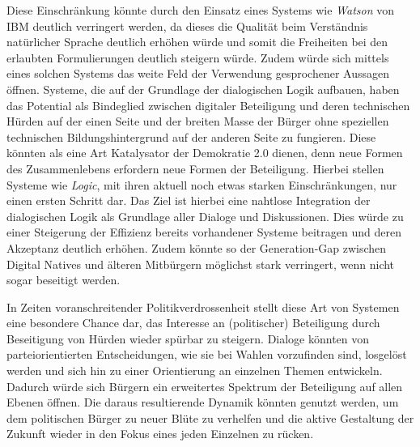 \documentclass[11pt,a4paper,bibtotocnumbered]{scrreprt}
\begin{document}
Diese Einschränkung könnte durch den Einsatz eines Systems wie \emph{Watson} \cite{Watson} von IBM deutlich verringert werden, da dieses die Qualität beim Verständnis natürlicher Sprache deutlich erhöhen würde und somit die Freiheiten bei den erlaubten Formulierungen deutlich steigern würde. Zudem würde sich mittels eines solchen Systems das weite Feld der Verwendung gesprochener Aussagen öffnen.
Systeme, die auf der Grundlage der dialogischen Logik aufbauen, haben das Potential als Bindeglied zwischen digitaler Beteiligung und deren technischen Hürden auf der einen Seite und der breiten Masse der Bürger ohne speziellen technischen Bildungshintergrund auf der anderen Seite zu fungieren. Diese könnten als eine Art Katalysator der Demokratie 2.0 dienen, denn neue Formen des Zusammenlebens erfordern neue Formen der Beteiligung. Hierbei stellen Systeme wie \emph{Logic}, mit ihren aktuell noch etwas starken Einschränkungen, nur einen ersten Schritt dar. Das Ziel ist hierbei eine nahtlose Integration der dialogischen Logik als Grundlage aller Dialoge und Diskussionen.
Dies würde zu einer Steigerung der Effizienz bereits vorhandener Systeme beitragen und deren Akzeptanz deutlich erhöhen.
Zudem könnte so der Generation-Gap zwischen Digital Natives und älteren Mitbürgern möglichst stark verringert, wenn nicht sogar beseitigt werden.

In Zeiten voranschreitender Politikverdrossenheit stellt diese Art von Systemen eine besondere Chance dar, das Interesse an (politischer) Beteiligung durch Beseitigung von Hürden wieder spürbar zu steigern. Dialoge könnten von parteiorientierten Entscheidungen, wie sie bei Wahlen vorzufinden sind, losgelöst werden und sich hin zu einer Orientierung an einzelnen Themen entwickeln. Dadurch würde sich Bürgern ein erweitertes Spektrum der Beteiligung auf allen Ebenen öffnen.
Die daraus resultierende Dynamik könnten genutzt werden, um dem politischen Bürger zu neuer Blüte zu verhelfen und die aktive Gestaltung der Zukunft wieder in den Fokus eines jeden Einzelnen zu rücken.
 
\end{document}
